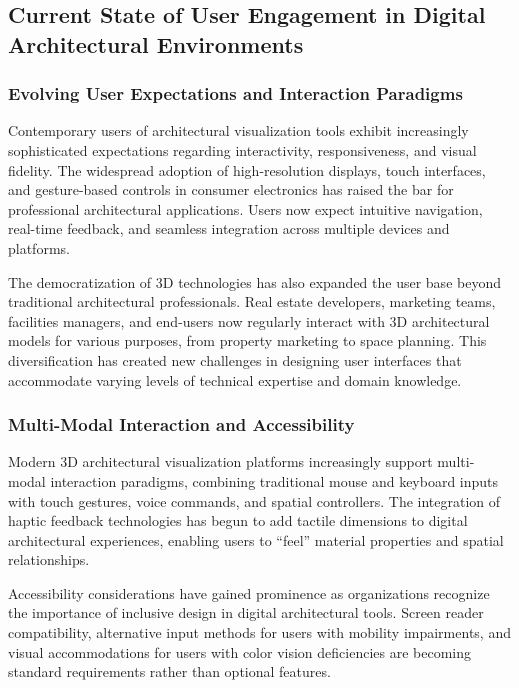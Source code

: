 \documentclass[12pt,a4paper]{book}
\begin{document}
\subsection{Current State of User Engagement in Digital Architectural Environments}
\label{subsec:current_user_engagement}

\subsubsection{Evolving User Expectations and Interaction Paradigms}
\label{subsubsec:evolving_expectations}

Contemporary users of architectural visualization tools exhibit increasingly sophisticated expectations regarding interactivity, responsiveness, and visual fidelity. The widespread adoption of high-resolution displays, touch interfaces, and gesture-based controls in consumer electronics has raised the bar for professional architectural applications. Users now expect intuitive navigation, real-time feedback, and seamless integration across multiple devices and platforms.

The democratization of 3D technologies has also expanded the user base beyond traditional architectural professionals. Real estate developers, marketing teams, facilities managers, and end-users now regularly interact with 3D architectural models for various purposes, from property marketing to space planning. This diversification has created new challenges in designing user interfaces that accommodate varying levels of technical expertise and domain knowledge.

\subsubsection{Multi-Modal Interaction and Accessibility}
\label{subsubsec:multimodal_interaction}

Modern 3D architectural visualization platforms increasingly support multi-modal interaction paradigms, combining traditional mouse and keyboard inputs with touch gestures, voice commands, and spatial controllers. The integration of haptic feedback technologies has begun to add tactile dimensions to digital architectural experiences, enabling users to ``feel'' material properties and spatial relationships.

Accessibility considerations have gained prominence as organizations recognize the importance of inclusive design in digital architectural tools. Screen reader compatibility, alternative input methods for users with mobility impairments, and visual accommodations for users with color vision deficiencies are becoming standard requirements rather than optional features.
\end{document}
